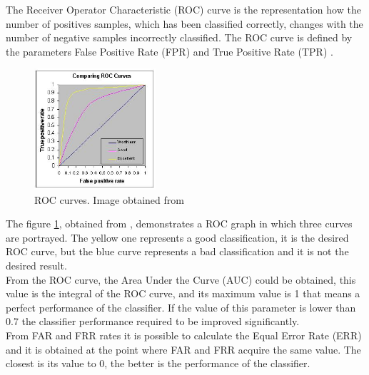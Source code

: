 The Receiver Operator Characteristic (ROC) curve is the representation how the number of positives samples, which has been classified correctly, changes with the number of negative samples incorrectly classified. The ROC curve is defined by the parameters False Positive Rate (FPR) and True Positive Rate (TPR) \cite{ROC}.\\

\begin{figure}[htb]
  \centering
  \includegraphics[width=0.4\textwidth]{images_miscelaneus/roccomp.jpg}
  \caption{ROC curves. Image obtained from \cite{RocImage}}
  \label{RocImage}
\end{figure}

The figure \ref{RocImage}, obtained from \cite{RocImage}, demonstrates a ROC graph in which three curves are portrayed.  The yellow one represents a good classification, it is the desired ROC curve, but the blue curve represents a bad classification and it is not the desired result.\\

From the ROC curve, the Area Under the Curve (AUC) could be obtained, this value is the integral of the ROC curve, and its maximum value is 1 that means a perfect performance of the classifier. If the value of this parameter is lower than 0.7 the classifier performance required to be improved significantly.\\

From FAR and FRR rates it is possible to calculate the Equal Error Rate (ERR) and it is obtained at the point where FAR and FRR acquire the same value. The closest is its value to 0, the better is the performance of the classifier.\\


